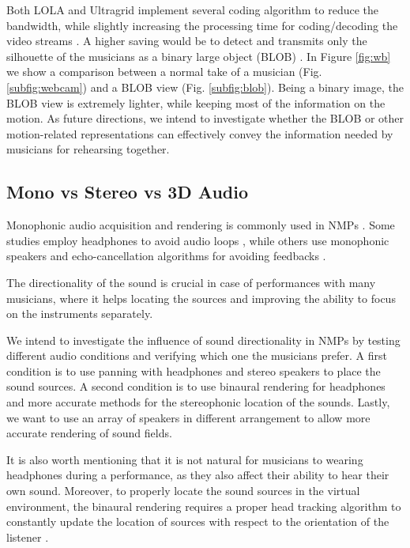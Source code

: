 Both LOLA and Ultragrid implement several coding algorithm to reduce the bandwidth, while slightly increasing the processing time for coding/decoding the video streams \cite{drioli2013networked,holub2006high}. A higher saving would be to detect and transmits only the silhouette of the musicians as a binary large object (BLOB) \cite{camurri2010visual}. In Figure \ref{fig:wb} we show a comparison between a normal take of a musician (Fig. \ref{subfig:webcam}) and a BLOB view (Fig. \ref{subfig:blob}).
Being a binary image, the BLOB view is extremely lighter, while keeping most of the information on the motion. As future directions, we intend to investigate whether the BLOB or other motion-related representations can effectively convey the information needed by musicians for rehearsing together. 


\subsection{Mono vs Stereo vs 3D Audio}
Monophonic audio acquisition and rendering is commonly used in NMPs \cite{CIM2018}. Some studies employ headphones to avoid audio loops \cite{RottondiFeature}, while others use monophonic speakers and echo-cancellation algorithms for avoiding feedbacks \cite{drioli2013networked}. 

The directionality of the sound is crucial %
in case of performances with many musicians, where it helps locating the sources and improving the ability to focus on the instruments separately. 

We intend to investigate the influence of sound directionality in NMPs by testing different audio conditions and verifying which one the musicians prefer. A first condition is to use panning with headphones and stereo speakers to place the sound sources. A second condition is to use binaural rendering for headphones and more accurate methods for the stereophonic location of the sounds. Lastly, we want to use an array of speakers in different arrangement to allow more accurate rendering of sound fields. 

It is also worth mentioning that it is not natural for musicians to wearing headphones during a performance, as they also affect their ability to hear their own sound. Moreover, to properly locate the sound sources in the virtual environment, the binaural rendering requires a proper head tracking algorithm to constantly update the location of sources with respect to the orientation of the listener \cite{Bonacina2016}.

